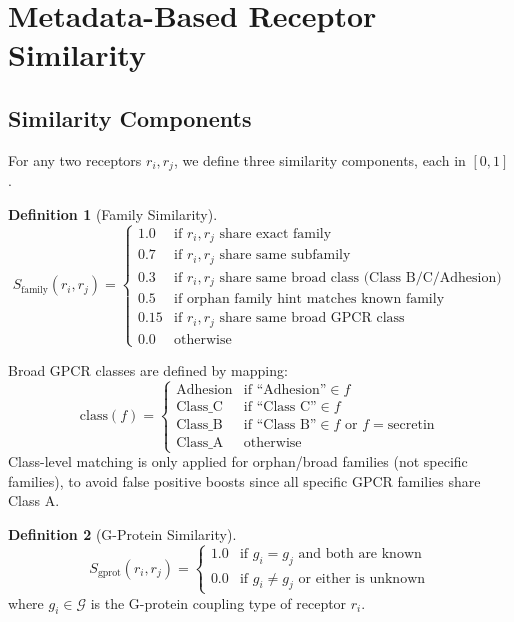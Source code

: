 \documentclass[12pt,oneside]{article}
\theoremstyle{definition}
\newtheorem{definition}{Definition}[section]
\begin{document}
\section{Metadata-Based Receptor Similarity}

\subsection{Similarity Components}

For any two receptors $r_i, r_j$, we define three similarity components, each in $[0, 1]$.

\begin{definition}[Family Similarity]
\begin{equation}
S_{\text{family}}(r_i, r_j) = 
\begin{cases}
1.0 & \text{if } r_i, r_j \text{ share exact family} \\
0.7 & \text{if } r_i, r_j \text{ share same subfamily} \\
0.3 & \text{if } r_i, r_j \text{ share same broad class (Class B/C/Adhesion)} \\
0.5 & \text{if orphan family hint matches known family} \\
0.15 & \text{if } r_i, r_j \text{ share same broad GPCR class} \\
0.0 & \text{otherwise}
\end{cases}
\label{eq:family_sim}
\end{equation}
\end{definition}

Broad GPCR classes are defined by mapping:
\begin{equation}
\text{class}(f) = 
\begin{cases}
\text{Adhesion} & \text{if ``Adhesion''} \in f \\
\text{Class\_C} & \text{if ``Class C''} \in f \\
\text{Class\_B} & \text{if ``Class B''} \in f \text{ or } f = \text{secretin} \\
\text{Class\_A} & \text{otherwise}
\end{cases}
\label{eq:broad_class}
\end{equation}
Class-level matching is only applied for orphan/broad families (not specific families), to avoid false positive boosts since all specific GPCR families share Class A.

\begin{definition}[G-Protein Similarity]
\begin{equation}
S_{\text{gprot}}(r_i, r_j) = 
\begin{cases}
1.0 & \text{if } g_i = g_j \text{ and both are known} \\
0.0 & \text{if } g_i \neq g_j \text{ or either is unknown}
\end{cases}
\label{eq:gprot_sim}
\end{equation}
where $g_i \in \mathcal{G}$ is the G-protein coupling type of receptor $r_i$.
\end{definition}
\end{document}
